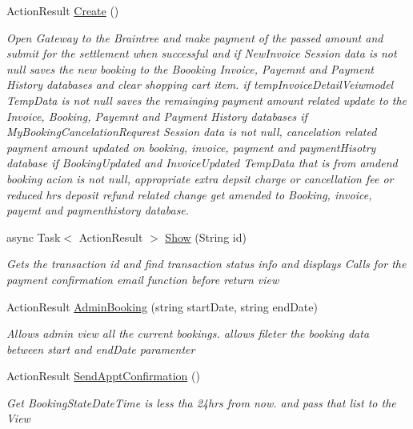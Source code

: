 \begin{DoxyCompactItemize}
Action\+Result \hyperlink{class_alfa_accounting_1_1_controllers_1_1_booking_view_models_controller_a6aab0900b3c5209a8674b3b909d7532b}{Create} ()
\begin{DoxyCompactList}\small\item\em Open Gateway to the Braintree and make payment of the passed amount and submit for the settlement when successful and if New\+Invoice Session data is not null saves the new booking to the Boooking Invoice, Payemnt and Payment History databases and clear shopping cart item. if temp\+Invoice\+Detail\+Veiwmodel Temp\+Data is not null saves the remainging payment amount related update to the Invoice, Booking, Payemnt and Payment History databases if My\+Booking\+Cancelation\+Requrest Session data is not null, cancelation related payment amount updated on booking, invoice, payment and payment\+Hisotry database if Booking\+Updated and Invoice\+Updated Temp\+Data that is from amdend booking acion is not null, appropriate extra depsit charge or cancellation fee or reduced hrs deposit refund related change get amended to Booking, invoice, payemt and paymenthistory database. \end{DoxyCompactList}\item 
async Task$<$ Action\+Result $>$ \hyperlink{class_alfa_accounting_1_1_controllers_1_1_booking_view_models_controller_aa3606d7cc1ee17ff8da3baaf866ea68b}{Show} (String id)
\begin{DoxyCompactList}\small\item\em Gets the transaction id and find transaction status info and displays Calls for the payment confirmation email function before return view \end{DoxyCompactList}\item 
Action\+Result \hyperlink{class_alfa_accounting_1_1_controllers_1_1_booking_view_models_controller_adf4a14a9683e52f9dff922c5e58bc125}{Admin\+Booking} (string start\+Date, string end\+Date)
\begin{DoxyCompactList}\small\item\em Allows admin view all the current bookings. allows fileter the booking data between start and end\+Date paramenter \end{DoxyCompactList}\item 
Action\+Result \hyperlink{class_alfa_accounting_1_1_controllers_1_1_booking_view_models_controller_a2c4f4b56be6badae27c572180cb3d8fd}{Send\+Appt\+Confirmation} ()
\begin{DoxyCompactList}\small\item\em Get Booking\+State\+Date\+Time is less tha 24hrs from now. and pass that list to the View \end{DoxyCompactList}\item 

\end{DoxyCompactItemize}
